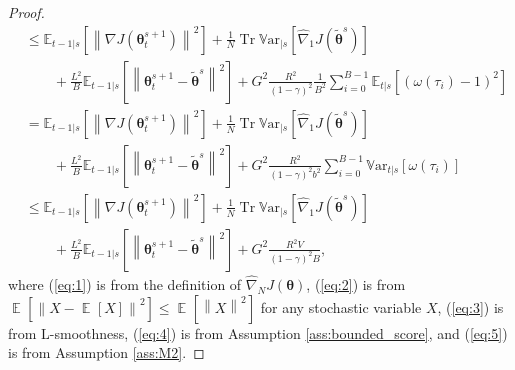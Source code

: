 \documentclass{article}
\theoremstyle{remark}
\theoremstyle{definition}
\DeclareMathOperator*{\EV}{\mathbb{E}}
\DeclareMathOperator{\Tr}{Tr}
\newcommand{\EVV}[2][\ppvect \in \ppspace]{\EV_{#1}\left[{#2}\right]}
\newcommand{\norm}[2][\infty]{\left\|#2\right\|_{#1}}
\newcommand{\vtheta}{\boldsymbol{\theta}}
\newcommand{\gradJ}[1]{\nabla J(#1)}
\newcommand{\gradApp}[2]{\widehat{\nabla}_{#2}J(#1)}
\newcommand{\Ets}[2][t]{\mathbb{E}_{#1\vert s}\left[#2\right]}
\newcommand{\Varts}[2][t]{{\mathbb{V}\text{ar}}_{#1\vert s}\left[#2\right]}
\newcommand{\VARRF}{V}
\newcommand{\GRADLOG}{G}
\begin{document}
\begin{proof}
\begin{align}
	&\leq \Ets[t-1]{\norm[]{\gradJ{\vtheta_t^{s+1}}}^2} 
	+\frac{1}{N}\Tr\Varts[]{\gradApp{\tilde{\vtheta}^s}{1}}
	\nonumber\\
	&\qquad+\frac{L^2}{B}\Ets[t-1]{\norm[]{\vtheta_t^{s+1}-\tilde{\vtheta}^s}^2}
	+\GRADLOG^2\frac{R^2}{(1-\gamma)^2}\frac{1}{B^2}\sum_{i=0}^{B-1}\Ets{(\omega(\tau_i)-1)^2} \label{eq:4}\\
	&= \Ets[t-1]{\norm[]{\gradJ{\vtheta_t^{s+1}}}^2} 
	+\frac{1}{N}\Tr\Varts[]{\gradApp{\tilde{\vtheta}^s}{1}}
	\nonumber\\
	&\qquad+\frac{L^2}{B}\Ets[t-1]{\norm[]{\vtheta_t^{s+1}-\tilde{\vtheta}^s}^2}
	+\GRADLOG^2\frac{R^2}{(1-\gamma)^2b^2}\sum_{i=0}^{B-1}\Varts{\omega(\tau_i)} \nonumber\\
	&\leq \Ets[t-1]{\norm[]{\gradJ{\vtheta_t^{s+1}}}^2} 
	+\frac{1}{N}\Tr\Varts[]{\gradApp{\tilde{\vtheta}^s}{1}}
	\nonumber\\
	&\qquad+\frac{L^2}{B}\Ets[t-1]{\norm[]{\vtheta_t^{s+1}-\tilde{\vtheta}^s}^2}
	+\GRADLOG^2\frac{R^2\VARRF}{(1-\gamma)^2B}, \label{eq:5}
\end{align}
where (\ref{eq:1}) is from the definition of $\gradApp{\vtheta}{N}$, (\ref{eq:2}) is from $\EVV[]{\norm[]{X-\EVV[]{X}}^2}\leq\EVV[]{\norm[]{X}^2}$ for any stochastic variable $X$, (\ref{eq:3}) is from L-smoothness, 
(\ref{eq:4}) is from Assumption \ref{ass:bounded_score}, and (\ref{eq:5}) is from Assumption \ref{ass:M2}.
\end{proof}
\end{document}
